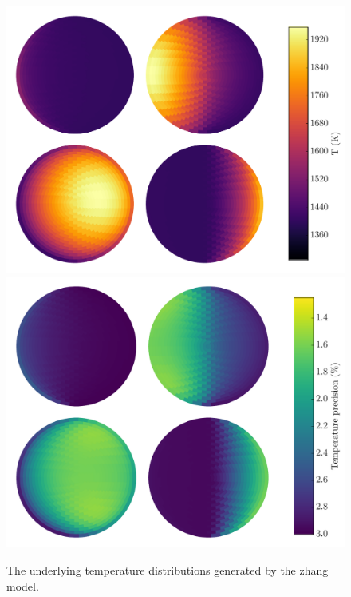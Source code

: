 \documentclass[a4paper,fleqn,usenatbib]{mnras}
\begin{document}
\begin{figure}
\begin{center}
\includegraphics[width=\columnwidth]{img/free_parameterstemp_map.pdf}
\includegraphics[width=\columnwidth]{img/free_parameterstemp_errs.pdf}
\caption{The underlying temperature distributions generated by the zhang model.}
\label{fig:best_fit_temp}
\end{center}
\end{figure}
\end{document}
